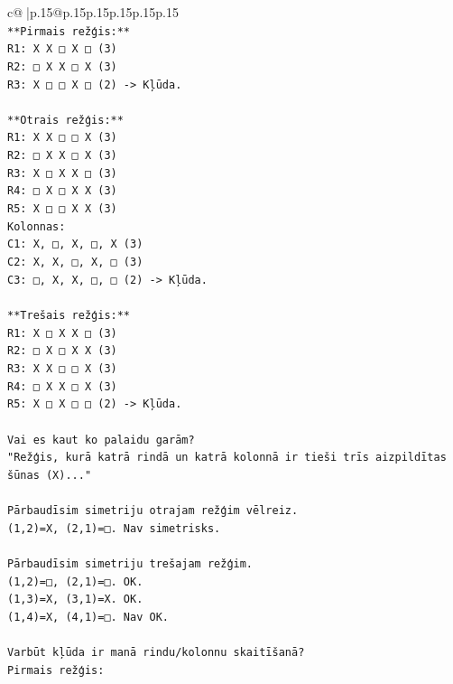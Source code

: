 \documentclass{article}
\begin{document}
{\begin{supertabular}{c@{$\;$}|p{.15\linewidth}@{}p{.15\linewidth}p{.15\linewidth}p{.15\linewidth}p{.15\linewidth}p{.15\linewidth}}
{{{\\ 
\texttt{**Pirmais režģis:**} \\
\texttt{R1: X X □ X □ (3)} \\
\texttt{R2: □ X X □ X (3)} \\
\texttt{R3: X □ □ X □ (2) {-}> Kļūda.} \\
\\ 
\texttt{**Otrais režģis:**} \\
\texttt{R1: X X □ □ X (3)} \\
\texttt{R2: □ X X □ X (3)} \\
\texttt{R3: X □ X X □ (3)} \\
\texttt{R4: □ X □ X X (3)} \\
\texttt{R5: X □ □ X X (3)} \\
\texttt{Kolonnas:} \\
\texttt{C1: X, □, X, □, X (3)} \\
\texttt{C2: X, X, □, X, □ (3)} \\
\texttt{C3: □, X, X, □, □ (2) {-}> Kļūda.} \\
\\ 
\texttt{**Trešais režģis:**} \\
\texttt{R1: X □ X X □ (3)} \\
\texttt{R2: □ X □ X X (3)} \\
\texttt{R3: X X □ □ X (3)} \\
\texttt{R4: □ X X □ X (3)} \\
\texttt{R5: X □ X □ □ (2) {-}> Kļūda.} \\
\\ 
\texttt{Vai es kaut ko palaidu garām?} \\
\texttt{"Režģis, kurā katrā rindā un katrā kolonnā ir tieši trīs aizpildītas šūnas (X)..."} \\
\\ 
\texttt{Pārbaudīsim simetriju otrajam režģim vēlreiz.} \\
\texttt{(1,2)=X, (2,1)=□. Nav simetrisks.} \\
\\ 
\texttt{Pārbaudīsim simetriju trešajam režģim.} \\
\texttt{(1,2)=□, (2,1)=□. OK.} \\
\texttt{(1,3)=X, (3,1)=X. OK.} \\
\texttt{(1,4)=X, (4,1)=□. Nav OK.} \\
\\ 
\texttt{Varbūt kļūda ir manā rindu/kolonnu skaitīšanā?} \\
\texttt{Pirmais režģis:} \\
}}}
\end{supertabular}}
\end{document}
